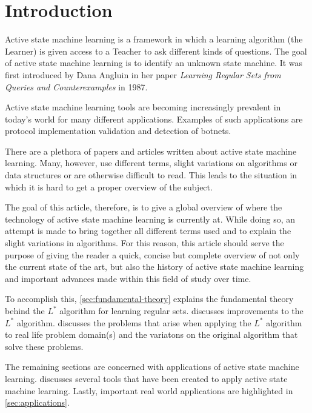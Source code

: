 \section*{Introduction}
\label{sec:introduction}

Active state machine learning is a framework in which a learning algorithm (the
Learner) is given access to a Teacher to ask different kinds of questions. The
goal of active state machine learning is to identify an unknown state machine.
It was first introduced by Dana Angluin in her paper \textit{Learning Regular
  Sets from Queries and Counterexamples} in 1987\cite{Angluin1987}.

Active state machine learning tools are becoming increasingly prevalent in
today's world for many different applications. Examples of such applications are
protocol implementation validation and detection of botnets.

There are a plethora of papers and articles written about active state machine
learning. Many, however, use different terms, slight variations on algorithms
or data structures or are otherwise difficult to read. This leads to the
situation in which it is hard to get a proper overview of the subject.

The goal of this article, therefore, is to give a global overview of where the
technology of active state machine learning is currently at. While doing so, an
attempt is made to bring together all different terms used and to explain the
slight variations in algorithms. For this reason, this article should serve the
purpose of giving the reader a quick, concise but complete overview of not only
the current state of the art, but also the history of active state machine
learning and important advances made within this field of study over time.

To accomplish this, \cref{sec:fundamental-theory} explains the fundamental
theory behind the $L^{*}$ algorithm for learning regular
sets.  discusses improvements to the $L^{*}$
algorithm.  discusses the problems that arise when applying
the $L^{*}$ algorithm to real life problem domain(s) and the variatons on the
original algorithm that solve these problems.

The remaining sections are concerned with applications of active state machine
learning.  discusses several tools that have been created to
apply active state machine learning. Lastly, important real world applications
are highlighted in \cref{sec:applications}.

\newpage
